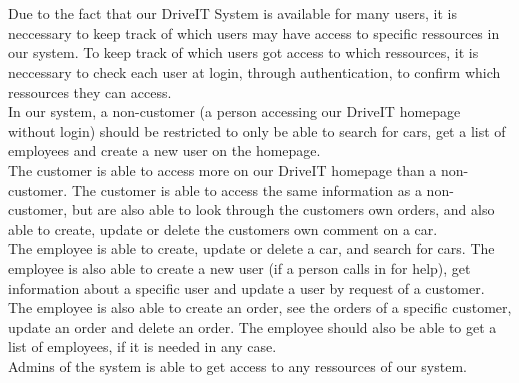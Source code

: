 \\\\
Due to the fact that our DriveIT System is available for many users, it is neccessary to keep track of which users may have access to specific ressources in our system. To keep track of which users got access to which ressources, it is neccessary to check each user at login, through authentication, to confirm which ressources they can access.\\

In our system, a non-customer (a person accessing our DriveIT homepage without login) should be restricted to only be able to search for cars, get a list of employees and create a new user on the homepage.\\

The customer is able to access more on our DriveIT homepage than a non-customer. The customer is able to access the same information as a non-customer, but are also able to look through the customers own orders, and also able to create, update or delete the customers own comment on a car.\\

The employee is able to create, update or delete a car, and search for cars. The employee is also able to create a new user (if a person calls in for help), get information about a specific user and update a user by request of a customer. The employee is also able to create an order, see the orders of a specific customer, update an order and delete an order. The employee should also be able to get a list of employees, if it is needed in any case.\\

Admins of the system is able to get access to any ressources of our system.